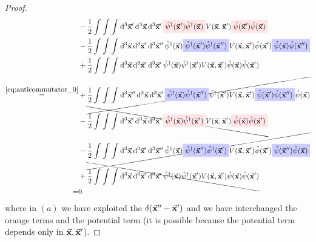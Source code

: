 \documentclass[11pt, a4paper, twoside, openright]{article}
\begin{document}
\begin{proof}
\begin{equation*}
\begin{split}
     &-
     \frac{1}{2} \int_{}^{} \int_{}^{} \int_{}^{} \dd[3]{\va{x}'} \dd[3]{\va{x}}  \dd[3]{\va{x}'}
     \mathcolorbox{pink!40}{\hat{\psi }^\dag (\va{x}')   \hat{\psi } ^\dag (\va{x})} V (\va{x},\va{x}') \mathcolorbox{pink!40}{\hat{\psi } (\va{x}') \hat{\psi } (\va{x})}\\
     &-
     \frac{1}{2} \int_{}^{} \int_{}^{} \int_{}^{} \dd[3]{\va{x}} \dd[3]{\va{x}'} \dd[3]{\va{x}''}
     \hat{\psi } ^\dag (\va{x})
     \mathcolorbox{blue!20}{\hat{\psi } ^\dag (\va{x}')    \hat{\psi }^\dag (\va{x}'')}   V (\va{x},\va{x}')  \hat{\psi } (\va{x}') \mathcolorbox{blue!20}{\hat{\psi } (\va{x}) \hat{\psi }(\va{x}'')} \\
     &+
     \frac{1}{2} \int_{}^{} \int_{}^{} \int_{}^{} \dd[3]{\va{x}} \dd[3]{\va{x}'} \dd[3]{\va{x}'}
     \hat{\psi } ^\dag (\va{x})
     \hat{\psi } ^\dag (\va{x}') V (\va{x},\va{x}') \hat{\psi } (\va{x}) \hat{\psi }(\va{x}') \\
     \overset{\eqref{eq:anticommutator_0}}{=} &
     +
     \cancel{ \frac{1}{2} \int_{}^{} \int_{}^{} \int_{}^{} \dd[3]{\va{x}''} \dd[3]{\va{x}}  \dd[3]{\va{x}'}
    \mathcolorbox{blue!20}{  \hat{\psi } ^\dag (\va{x}) \hat{\psi }^\dag (\va{x}'') }  \hat{\psi } ^\dag (\va{x}')  V (\va{x},\va{x}')   \mathcolorbox{blue!20}{  \hat{\psi } (\va{x}') \hat{\psi }(\va{x}'') } \hat{\psi } (\va{x})
    }\\
    &-
    \bcancel{
    \frac{1}{2} \int_{}^{} \int_{}^{} \int_{}^{} \dd[3]{\va{x}'} \dd[3]{\va{x}}  \dd[3]{\va{x}'}
    \mathcolorbox{pink!40}{ \hat{\psi } ^\dag (\va{x}) \hat{\psi }^\dag (\va{x}')  } V (\va{x},\va{x}') \mathcolorbox{pink!40}{\hat{\psi } (\va{x}) \hat{\psi } (\va{x}')}
    }\\
    &-
    \cancel{
    \frac{1}{2} \int_{}^{} \int_{}^{} \int_{}^{} \dd[3]{\va{x}} \dd[3]{\va{x}'} \dd[3]{\va{x}''}
    \hat{\psi } ^\dag (\va{x})
    \mathcolorbox{blue!20}{ \hat{\psi }^\dag (\va{x}'') \hat{\psi } ^\dag (\va{x}') }   V (\va{x},\va{x}')  \hat{\psi } (\va{x}') \mathcolorbox{blue!20}{ \hat{\psi }(\va{x}'') \hat{\psi } (\va{x}) }
    }\\
    &+
    \bcancel{
    \frac{1}{2} \int_{}^{} \int_{}^{} \int_{}^{} \dd[3]{\va{x}} \dd[3]{\va{x}'} \dd[3]{\va{x}'}
    \hat{\psi } ^\dag (\va{x})
    \hat{\psi } ^\dag (\va{x}') V (\va{x},\va{x}') \hat{\psi } (\va{x}) \hat{\psi }(\va{x}')
    } \\
    =& 0
\end{split}
\end{equation*}
where in \( (a) \) we have exploited the \( \delta (\va{x}''-\va{x}') \) and we have interchanged the orange terms and the potential term (it is possible because the potential term depends only in \( \va{x},\va{x}' \)).


\end{proof}
\end{document}
